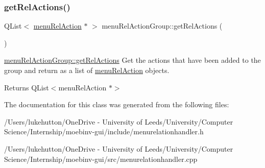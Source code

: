 \subsubsection{\texorpdfstring{get\+Rel\+Actions()}{getRelActions()}}
{\footnotesize\ttfamily Q\+List$<$ \mbox{\hyperlink{classmenu_rel_action}{menu\+Rel\+Action}} $\ast$ $>$ menu\+Rel\+Action\+Group\+::get\+Rel\+Actions (\begin{DoxyParamCaption}{ }\end{DoxyParamCaption})}



\mbox{\hyperlink{classmenu_rel_action_group_ac050bdcde34d72fc17c4fed70d2bfa6c}{menu\+Rel\+Action\+Group\+::get\+Rel\+Actions}} Get the actions that have been added to the group and return as a list of \mbox{\hyperlink{classmenu_rel_action}{menu\+Rel\+Action}} objects. 

\begin{DoxyReturn}{Returns}
Q\+List$<$menu\+Rel\+Action $\ast$$>$ 
\end{DoxyReturn}


The documentation for this class was generated from the following files\+:\begin{DoxyCompactItemize}
\item 
/\+Users/lukehutton/\+One\+Drive -\/ University of Leeds/\+University/\+Computer Science/\+Internship/moebinv-\/gui/include/menurelationhandler.\+h\item 
/\+Users/lukehutton/\+One\+Drive -\/ University of Leeds/\+University/\+Computer Science/\+Internship/moebinv-\/gui/src/menurelationhandler.\+cpp\end{DoxyCompactItemize}
